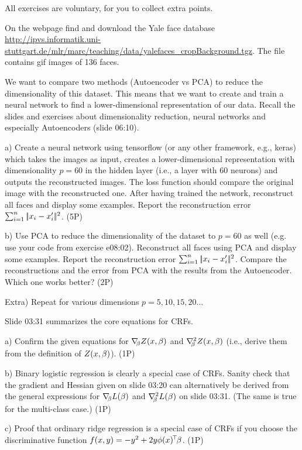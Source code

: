 

\renewcommand{\course}{Machine Learning}
\renewcommand{\exnum}{12}

\exercises
{}
\exercisestitle

All exercises are voluntary, for you to collect extra points.



On the webpage find and download the Yale face database
{\tiny\url{http://ipvs.informatik.uni-stuttgart.de/mlr/marc/teaching/data/yalefaces_cropBackground.tgz}}. The
file contains gif images of 136 faces.

We want to compare two methods (Autoencoder vs PCA) to reduce the dimensionality
of this dataset. This means that we want to create and train a neural network to
find a lower-dimensional representation of our data. Recall the slides and exercises
about dimensionality reduction, neural networks and especially Autoencoders
(slide 06:10).

a) Create a neural network using tensorflow (or any other framework, e.g., keras) which
takes the images as input, creates a lower-dimensional representation with dimensionality
$p=60$ in the hidden layer (i.e., a layer with $60$ neurons) and outputs the reconstructed
images. The loss function should compare the original image with the reconstructed
one. After having trained the network, reconstruct all faces and display some examples.
Report the reconstruction error $\sum_{i=1}^n \norm{x_i - x'_i}^2$. (5P)

b) Use PCA to reduce the dimensionality of the dataset to $p=60$ as well (e.g. use your
code from exercise e08:02). Reconstruct all faces using PCA and display some examples.
Report the reconstruction error $\sum_{i=1}^n \norm{x_i - x'_i}^2$. Compare the
reconstructions and the error from PCA with the results from the Autoencoder. Which
one works better? (2P)

Extra) Repeat for various dimensions $p=5, 10, 15, 20\ldots$



Slide 03:31 summarizes the core equations for CRFs.

a) Confirm the given equations for $\na_\b Z(x,\b)$ and $\he[\b]
Z(x,\b)$ (i.e., derive them from the definition of $Z(x,\b)$). (1P)

b) Binary logistic regression is clearly a special case of
CRFs. Sanity check that the gradient and Hessian given on slide 03:20
can alternatively be derived from the general expressions for $\na_\b L(\b)$ and
$\he[\b] L(\b)$ on slide 03:31. (The same is true for the multi-class case.) (1P)

c) Proof that ordinary ridge regression is a special case of CRFs if
you choose the discriminative function $f(x,y) = - y^2 + 2 y \phi(x)^\T \b$. (1P)

\exerfoot
